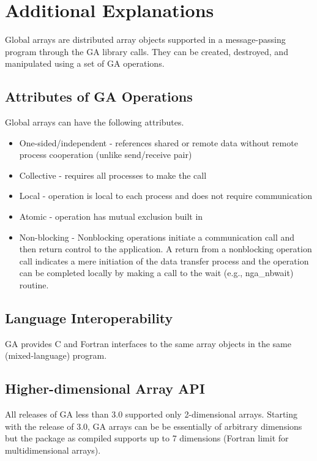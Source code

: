 \documentclass[12pt]{article}
\begin{document}
\section{Additional Explanations}

Global arrays are distributed array objects supported in a message-passing program through the GA library calls. They can be created, destroyed, and manipulated using a set of GA operations.

\subsection{Attributes of GA Operations}

Global arrays can have the following attributes.

\begin{itemize}
\item One-sided/independent - references shared or remote data without remote process cooperation (unlike send/receive pair)
\item Collective - requires all processes to make the call
\item Local - operation is local to each process and does not require communication
\item Atomic - operation has mutual exclusion built in 
\item Non-blocking - Nonblocking operations initiate a communication call and then return control to the application. A return from a nonblocking operation call indicates a mere initiation of the data transfer process and the operation can be completed locally by making a call to the wait (e.g., nga_nbwait) routine.
\end{itemize}
 
\subsection{Language Interoperability}

GA provides C and Fortran interfaces  to the same array objects in the same (mixed-language) program.

\subsection{Higher-dimensional Array API}

All releases of GA less than 3.0 supported only 2-dimensional arrays. Starting with the release of 3.0, GA arrays can be be essentially of arbitrary dimensions but the package as compiled supports up to 7 dimensions (Fortran limit for multidimensional arrays).
\end{document}
